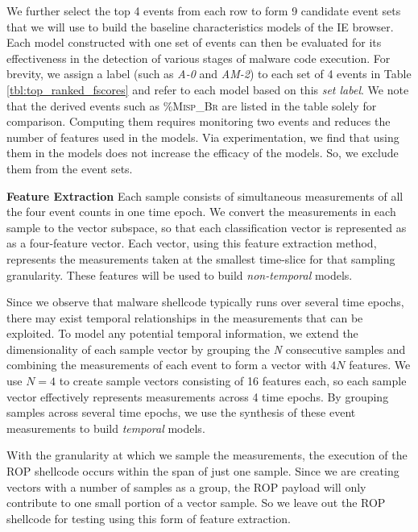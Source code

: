 \documentclass{acm_proc_article-sp}
\begin{document}
We further select the top 4 events from each row to form 9 candidate 
event sets that we will use to build 
the baseline characteristics models of the IE browser.
Each model constructed with one set of events can then be evaluated 
for its effectiveness in the detection of various stages of malware 
code execution. For brevity, we assign a label (such as \textit{A-0} 
and \textit{AM-2}) to each set of 4 events in Table 
\ref{tbl:top_ranked_fscores} and refer to each model based on this
\textit{set label}. We note that the derived events such as 
\textsc{\%Misp\_Br} are listed in the table solely for comparison. 
Computing them requires monitoring two events and reduces the number
of features used in the models. Via experimentation, we find that 
using them in the models does not increase the efficacy of the models. 
So, we exclude them from the event sets.

\textbf{Feature Extraction} \space\space Each sample consists of 
simultaneous measurements of all the four event counts in one time epoch. 
We convert the measurements in each sample to the vector subspace, so 
that each classification vector is represented as as a four-feature 
vector. Each vector, using this feature extraction method, represents 
the measurements taken at the smallest time-slice for that sampling 
granularity. These features will be used to build \textit{non-temporal} models.

Since we observe that malware shellcode typically runs over several time 
epochs, there may exist temporal relationships in the measurements 
that can be exploited. To model any potential temporal information, 
we extend the dimensionality of each sample vector by grouping the 
\textit{N} consecutive samples and combining the measurements of each 
event to form a vector with $4N$ features. We use $N=4$ to create 
sample vectors consisting of 16 features each, so each sample vector 
effectively represents measurements across 4 time epochs. By grouping
samples across several time epochs, we use the synthesis of these 
event measurements to build \textit{temporal} models.

With the 
granularity at which we sample the measurements, the execution of 
the ROP shellcode occurs within the span of just one sample. Since we 
are creating vectors with a number of samples as a group, the ROP 
payload will only contribute to one small portion of a vector sample. 
So we leave out the ROP shellcode for testing using this form of 
feature extraction.
\end{document}
